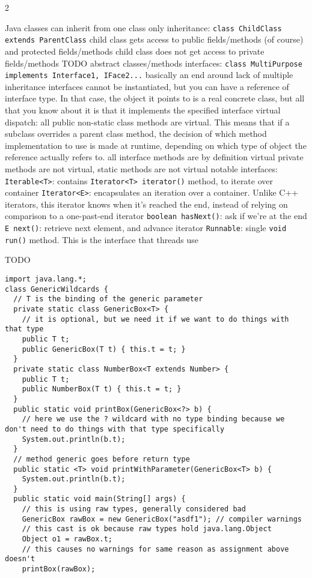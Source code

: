 \documentclass{article}
\def \columncount {2}
\newcommand{\codesize}{8.5}
\newcommand{\java}[1]{{\fontsize{\codesize}{\codesize}\selectfont\texttt{#1}}}
\begin{document}
\begin{multicols}{\columncount}
\begin{outline}[longenum]
  \1 Java classes can inherit from one class only
    \2 inheritance: \java{class ChildClass extends ParentClass}
    \2 child class gets access to public fields/methods (of course) and protected fields/methods
    \2 child class does not get access to private fields/methods
    \2 TODO abstract classes/methods
  \1 interfaces: \java{class MultiPurpose implements Interface1, IFace2...}
    \2 basically an end around lack of multiple inheritance
    \2 interfaces cannot be instantiated, but you can have a reference of interface type. In that case, the object it points to is a real concrete class, but all that you know about it is that it implements the specified interface
  \1 virtual dispatch:
    \2 all public non-static class methods are virtual.
      This means that if a subclass overrides a parent class method, the decision of which method implementation to use is made at runtime, depending on which type of object the reference actually refers to.
    \2 all interface methods are by definition virtual
    \2 private methods are not virtual, static methods are not virtual
  \1 notable interfaces:
    \2 \java{Iterable<T>}: contains \java{Iterator<T> iterator()} method, to iterate over container
    \2 \java{Iterator<E>}: encapsulates an iteration over a container. Unlike C++ iterators, this iterator knows when it's reached the end, instead of relying on comparison to a one-past-end iterator
      \3 \java{boolean hasNext()}: ask if we're at the end
      \3 \java{E next()}: retrieve next element, and advance iterator
    \2 \java{Runnable}: single \java{void run()} method. This is the interface that threads use

  \1 TODO
\0\begin{verbatim}
import java.lang.*;
class GenericWildcards {
  // T is the binding of the generic parameter
  private static class GenericBox<T> {
    // it is optional, but we need it if we want to do things with that type
    public T t;
    public GenericBox(T t) { this.t = t; }
  }
  private static class NumberBox<T extends Number> {
    public T t;
    public NumberBox(T t) { this.t = t; } 
  }
  public static void printBox(GenericBox<?> b) {
    // here we use the ? wildcard with no type binding because we don't need to do things with that type specifically
    System.out.println(b.t);
  }
  // method generic goes before return type
  public static <T> void printWithParameter(GenericBox<T> b) {
    System.out.println(b.t);
  }
  public static void main(String[] args) {
    // this is using raw types, generally considered bad
    GenericBox rawBox = new GenericBox("asdf1"); // compiler warnings
    // this cast is ok because raw types hold java.lang.Object
    Object o1 = rawBox.t;
    // this causes no warnings for same reason as assignment above doesn't
    printBox(rawBox);
    

\end{verbatim}
\end{outline}
\end{multicols}
\end{document}
